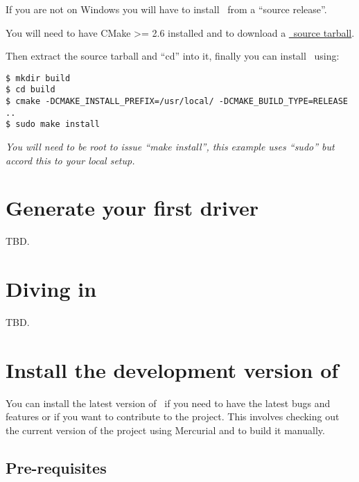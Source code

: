\documentclass[american]{rtxarticle}
\begin{document}
If you are not on Windows you will have to install \rtx\ from a ``source
release''.

You will need to have CMake >= 2.6 installed and to download a
\href{http://rathaxes.googlecode.com/files/rathaxes-src-latest.tar.gz}{\rtx\ source tarball}.

Then extract the source tarball and ``cd'' into it, finally you can install
\rtx\ using:

\begin{lstlisting}
$ mkdir build
$ cd build
$ cmake -DCMAKE_INSTALL_PREFIX=/usr/local/ -DCMAKE_BUILD_TYPE=RELEASE ..
$ sudo make install
\end{lstlisting}

\emph{You will need to be root to issue ``make install'', this example uses
``sudo'' but accord this to your local setup.}

\section{Generate your first driver}

TBD.

\section{Diving in}

TBD.


\section{Install the development version of \rtx}

You can install the latest version of \rtx\ if you need to have the latest bugs
and features or if you want to contribute to the project. This involves checking
out the current version of the project using Mercurial and to build it manually.

\subsection{Pre-requisites}
\end{document}
